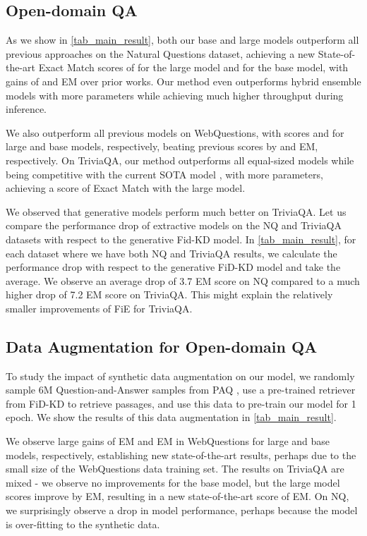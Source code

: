 \documentclass[11pt]{article}
\begin{document}
\subsection{Open-domain QA}
\label{sec:res}



As we show in \cref{tab_main_result}, both our base and large models outperform all previous approaches on the Natural Questions dataset, achieving a new State-of-the-art Exact Match scores of  for the large model and  for the base model, with gains of  and  EM over prior works. Our method even outperforms hybrid ensemble models \cite{cheng-etal-2021-unitedqa} with  more parameters while achieving much higher throughput during inference. 

We also outperform all previous models on WebQuestions, with scores  and  for large and base models, respectively, beating previous scores by  and  EM, respectively. On TriviaQA, our method outperforms all equal-sized models while being competitive with the current SOTA model \cite{fidkd}, with  more parameters, achieving a score of  Exact Match with the large model.

We observed that generative models perform much better on TriviaQA. Let us compare the performance drop of extractive models on the NQ and TriviaQA datasets with respect to the generative Fid-KD model. In \cref{tab_main_result}, for each dataset where we have both NQ and TriviaQA results, we calculate the performance drop with respect to the generative FiD-KD model and take the average. We observe an average drop of 3.7 EM score on NQ compared to a much higher drop of 7.2 EM score on TriviaQA. This might explain the relatively smaller improvements of FiE for TriviaQA. 



\subsection{Data Augmentation for Open-domain QA}
\label{data_aug}

To study the impact of synthetic data augmentation on our model, we randomly sample 6M Question-and-Answer samples from PAQ \cite{paq}, use a pre-trained retriever from FiD-KD \cite{fidkd} to retrieve passages, and use this data to pre-train our model for 1 epoch. We show the results of this data augmentation in \cref{tab_main_result}.

We observe large gains of  EM and  EM in WebQuestions for large and base models, respectively, establishing new state-of-the-art results, perhaps due to the small size of the WebQuestions data training set. The results on TriviaQA are mixed - we observe no improvements for the base model, but the large model scores improve by  EM, resulting in a new state-of-the-art score of  EM. On NQ, we surprisingly observe a drop in model performance, perhaps because the model is over-fitting to the synthetic data.
\end{document}
